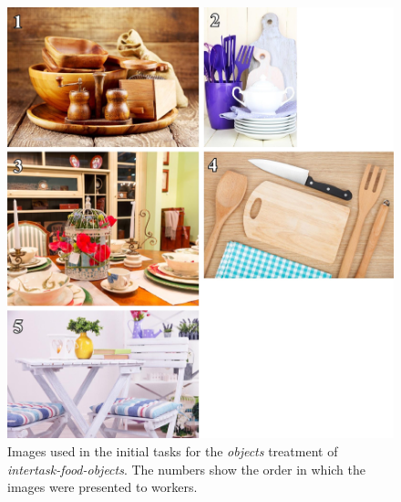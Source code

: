 \documentclass[12pt]{article}
\begin{document}
\begin{figure}
	\begin{center}
	\includegraphics{figs/task1-obj.jpg}
	\end{center}
	\caption{
		Images used in the initial tasks for the
		\textit{objects} treatment of \textit{intertask-food-objects}.  
		The numbers show the order in which the images were presented to 
		workers.
	}
	\label{fig:task1:obj}
\end{figure}
\end{document}
